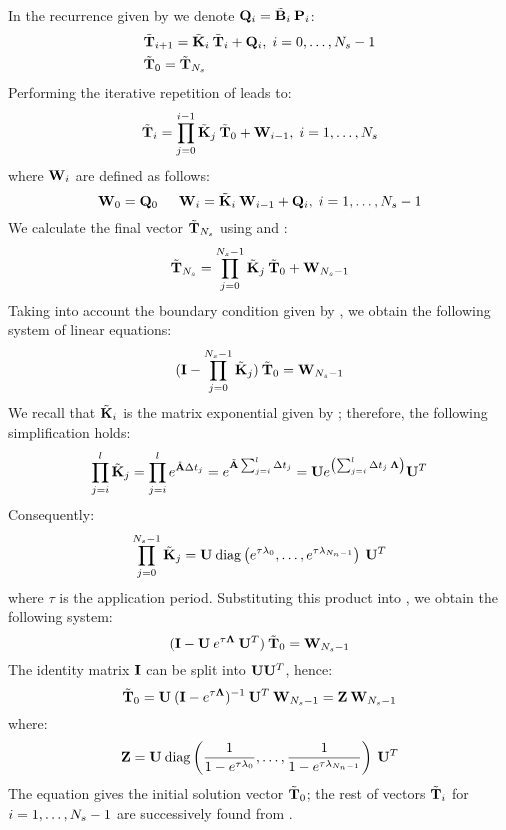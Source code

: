 In the recurrence given by  we denote $\mathbf{Q}_i =
\tilde{\mathbf{B}}_i \: \mathbf{P}_i$:
\begin{align}
  & \tv{T}_{i + 1} = \tm{K}_i \: \tv{T}_i + \m{Q}_i, \; i = \range{0}{N_s - 1} \elab{ce-recurrent} \\
  & \tv{T}_0 = \tv{T}_{N_s} \nonumber
\end{align}
Performing the iterative repetition of  leads to:
\begin{equation} \elab{y-recurrent}
  \tv{T}_i = \prod_{j = 0}^{i - 1} \tm{K}_j \: \tv{T}_0 + \m{W}_{i - 1}, \; i = \range{1}{N_s}
\end{equation}
where $\mathbf{W}_i$ are defined as follows:
\begin{equation}
  \m{W}_0 = \m{Q}_0 \hspace{15pt} \m{W}_i = \tm{K}_i \: \m{W}_{i - 1} + \m{Q}_i, \; i = \range{1}{N_s - 1} \elab{p-recurrent}
\end{equation}
We calculate the final vector $\tilde{\mathbf{T}}_{N_s}$ using  and
:
\[
  \tilde{\mathbf{T}}_{N_s} = \prod_{j = 0}^{N_s - 1} \tilde{\mathbf{K}}_j \: \tilde{\mathbf{T}}_0 + \mathbf{W}_{N_s - 1}
\]
Taking into account the boundary condition given by ,
we obtain the following system of linear equations:
\begin{equation} \elab{core-system}
  (\m{I} - \prod_{j = 0}^{N_s - 1} \tm{K}_j) \: \tv{T}_0 = \m{W}_{N_s - 1}
\end{equation}
We recall that $\tilde{\mathbf{K}}_i$ is the matrix exponential given by
; therefore, the following simplification holds:
\[
  \prod_{j = i}^l \tilde{\mathbf{K}}_j = \prod_{j = i}^l e^{\tilde{\mathbf{A}} \Delta t_j} = e^{\tilde{\mathbf{A}} \sum_{j = i}^l \Delta t_j} = \mathbf{U} e^{\left( \sum_{j = i}^l \Delta t_j \: \mathbf{\Lambda} \right)} \mathbf{U}^T
\]
Consequently:
\[
  \prod_{j = 0}^{N_s - 1} \tilde{\mathbf{K}}_j = \mathbf{U} \: \mathrm{diag}\left(e^{\tau \lambda_0}, \dots, e^{\tau \lambda_{N_n - 1}}\right) \: \mathbf{U}^T
\]
where $\tau$ is the application period. Substituting this product into
, we obtain the following system:
\[
  (\mathbf{I} - \mathbf{U} \: e^{\tau \mathbf{\Lambda}} \: \mathbf{U}^T) \: \tilde{\mathbf{T}}_0 = \mathbf{W}_{N_s - 1}
\]
The identity matrix $\mathbf{I}$ can be split into $\mathbf{U} \mathbf{U}^T$, hence:
\begin{equation} \elab{t0}
  \tv{T}_0 = \m{U} \: (\m{I} - e^{\tau \m{\Lambda}})^{-1} \: \m{U}^T \: \m{W}_{N_s - 1} = \m{Z} \: \m{W}_{N_s - 1}
\end{equation}
where:
\[
  \mathbf{Z} = \mathbf{U} \: \mathrm{diag}\left(\frac{1}{1 - e^{\tau \lambda_0}}, \dots, \frac{1}{1 - e^{\tau \lambda_{N_n - 1}}}\right) \: \mathbf{U}^T
\]
The equation gives the initial solution vector $\tilde{\mathbf{T}}_0$; the rest of vectors
$\tilde{\mathbf{T}}_i$ for $i = 1, \dots, N_s - 1$ are successively found from
.

